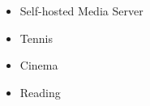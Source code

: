 %
%
%


\begin{itemize}
	\item Self-hosted Media Server
	\item Tennis
	\item Cinema
	\item Reading
\end{itemize}